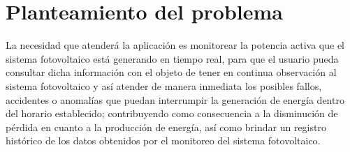 
\section{Planteamiento del problema}

La necesidad que atenderá la aplicación es monitorear la potencia activa que el sistema fotovoltaico está generando en tiempo real, para que el usuario pueda consultar dicha información con el objeto de tener en continua observación al sistema fotovoltaico y así atender de manera inmediata los posibles fallos, accidentes o anomalías que puedan interrumpir la generación de energía dentro del horario establecido; contribuyendo como consecuencia a la disminución de pérdida en cuanto a la producción de energía, así como brindar un registro histórico de los datos obtenidos por el monitoreo del sistema fotovoltaico.

